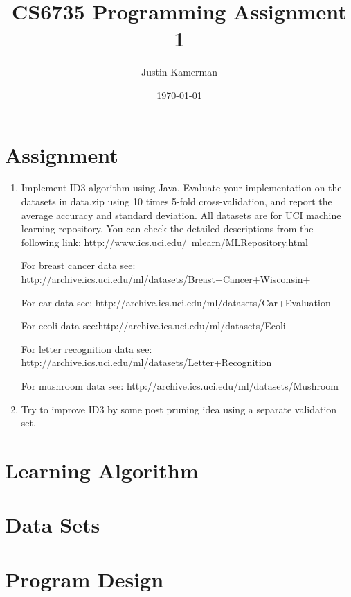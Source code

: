 \documentclass[10pt]{report}
\title{CS6735 Programming Assignment 1}
\author{Justin Kamerman}
\date{\today}
\begin{document}
\maketitle

\section*{Assignment}
\begin{enumerate} 
\item Implement ID3 algorithm using Java. Evaluate your implementation
  on the datasets in data.zip using 10 times 5-fold cross-validation,
  and report the average accuracy and standard deviation. All datasets
  are for UCI machine learning repository. You can check the detailed
  descriptions from the following link: 
  http://www.ics.uci.edu/~mlearn/MLRepository.html

For breast cancer data see:
http://archive.ics.uci.edu/ml/datasets/Breast+Cancer+Wisconsin+%

For car data see:
http://archive.ics.uci.edu/ml/datasets/Car+Evaluation

For ecoli data see:http://archive.ics.uci.edu/ml/datasets/Ecoli

For letter recognition data see:
http://archive.ics.uci.edu/ml/datasets/Letter+Recognition

For mushroom data see: http://archive.ics.uci.edu/ml/datasets/Mushroom

\item Try to improve ID3 by some post pruning idea using a separate
  validation set.
\end{enumerate}

\section*{Learning Algorithm}

\section*{Data Sets}

\section*{Program Design}
\end{document}
